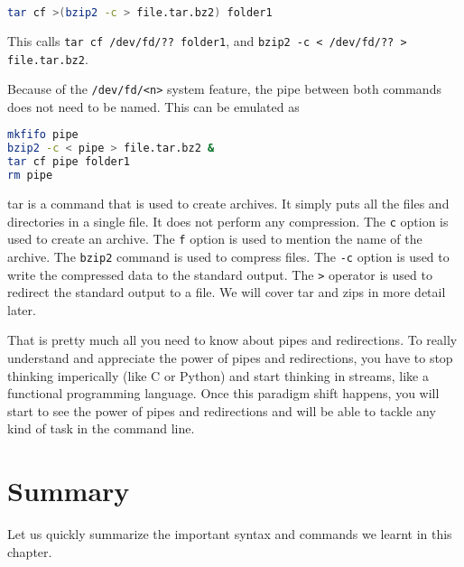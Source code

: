 \begin{lstlisting}[language=bash]
tar cf >(bzip2 -c > file.tar.bz2) folder1
\end{lstlisting}

This calls \lstinline|tar cf /dev/fd/?? folder1|,
and \lstinline|bzip2 -c < /dev/fd/?? > file.tar.bz2|.


Because of the \lstinline|/dev/fd/<n>| system feature,
the pipe between both commands does not need to be named.
This can be emulated as

\begin{lstlisting}[language=bash]
mkfifo pipe
bzip2 -c < pipe > file.tar.bz2 &
tar cf pipe folder1
rm pipe
\end{lstlisting}

\begin{remark}
  tar is a command that is used to create archives.
  It simply puts all the files and directories in a single file.
  It does not perform any compression. The \lstinline|c| option is
  used to create an archive. The \lstinline|f| option is used to
  mention the name of the archive. The \lstinline|bzip2| command
  is used to compress files. The \lstinline|-c| option is used to
  write the compressed data to the standard output. The \lstinline|>|
  operator is used to redirect the standard output to a file.
  We will cover tar and zips in more detail later.
\end{remark}

That is pretty much all you need to know about pipes and redirections.
To really understand and appreciate the power of pipes and redirections,
you have to stop thinking imperically (like C or Python) and start
thinking in streams, like a functional programming language.
Once this paradigm shift happens, you will start to see the power
of pipes and redirections and will be able to tackle any kind of
task in the command line.

\vfill
\pagebreak
\section{Summary}

Let us quickly summarize the important syntax and commands we learnt
in this chapter.

